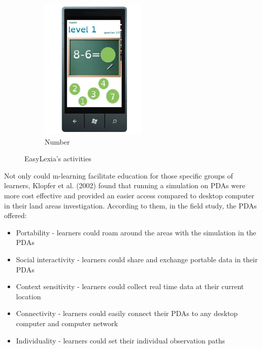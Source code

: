 \begin{figure}[!hbt]
\begin{subfigure}{0.25\textwidth}
        \includegraphics[width=\textwidth]{poten8}
        \caption{Number}
    \end{subfigure}
    \caption{EasyLexia's activities \cite{skiada2014easylexia}}
\end{figure}

Not only could m-learning facilitate education for those specific groups of learners, Klopfer et al. (2002) \cite{klopfer2002environmental} found that running a simulation on PDAs were more cost effective and provided an easier access compared to desktop computer in their land areas investigation. According to them, in the field study, the PDAs offered: 
\begin{itemize}
\item Portability - learners could roam around the areas with the simulation in the PDAs 
\item Social interactivity - learners could share and exchange portable data in their PDAs 
\item Context sensitivity - learners could collect real time data at their current location 
\item Connectivity - learners could easily connect their PDAs to any desktop computer and computer network 
\item Individuality - learners could set their individual observation paths
\end{itemize} 

